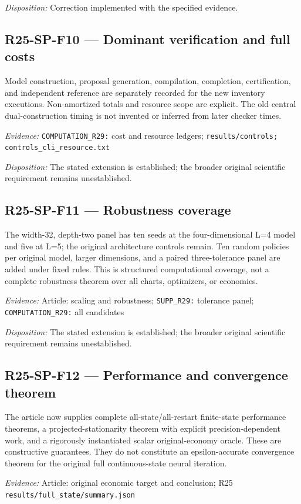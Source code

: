\emph{Disposition:} Correction implemented with the specified evidence.
\subsection{R25-SP-F10 --- Dominant verification and full costs}
Model construction, proposal generation, compilation, completion, certification, and independent reference are separately recorded for the new inventory executions. Non-amortized totals and resource scope are explicit. The old central dual-construction timing is not invented or inferred from later checker times.

\emph{Evidence:} \nolinkurl{COMPUTATION_R29:} cost and resource ledgers; \nolinkurl{results/controls;} \nolinkurl{controls_cli_resource.txt}

\emph{Disposition:} The stated extension is established; the broader original scientific requirement remains unestablished.
\subsection{R25-SP-F11 --- Robustness coverage}
The width-32, depth-two panel has ten seeds at the four-dimensional L=4 model and five at L=5; the original architecture controls remain. Ten random policies per original model, larger dimensions, and a paired three-tolerance panel are added under fixed rules. This is structured computational coverage, not a complete robustness theorem over all charts, optimizers, or economies.

\emph{Evidence:} Article: scaling and robustness; \nolinkurl{SUPP_R29:} tolerance panel; \nolinkurl{COMPUTATION_R29:} all candidates

\emph{Disposition:} The stated extension is established; the broader original scientific requirement remains unestablished.
\subsection{R25-SP-F12 --- Performance and convergence theorem}
The article now supplies complete all-state/all-restart finite-state performance theorems, a projected-stationarity theorem with explicit precision-dependent work, and a rigorously instantiated scalar original-economy oracle. These are constructive guarantees. They do not constitute an epsilon-accurate convergence theorem for the original full continuous-state neural iteration.

\emph{Evidence:} Article: original economic target and conclusion; R25 \nolinkurl{results/full_state/summary.json}

